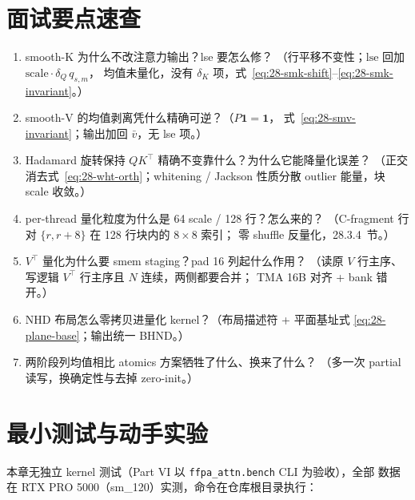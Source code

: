 \section{面试要点速查}

\begin{enumerate}[itemsep=1pt,topsep=2pt]
  \item smooth-K 为什么不改注意力输出？lse 要怎么修？
        （行平移不变性；$\mathrm{lse}$ 回加 $\mathrm{scale}\cdot\delta_Q\,q_{s,m}$，
        均值未量化，没有 $\delta_K$ 项，式~\ref{eq:28-smk-shift}--\ref{eq:28-smk-invariant}。）
  \item smooth-V 的均值剥离凭什么精确可逆？（$P\mathbf{1}=\mathbf{1}$，
        式~\ref{eq:28-smv-invariant}；输出加回 $\bar v$，无 lse 项。）
  \item Hadamard 旋转保持 $QK^{\top}$ 精确不变靠什么？为什么它能降量化误差？
        （正交消去式~\ref{eq:28-wht-orth}；whitening / Jackson 性质分散 outlier
        能量，块 scale 收敛。）
  \item per-thread 量化粒度为什么是 64 scale / 128 行？怎么来的？
        （C-fragment 行对 $\{r,r+8\}$ 在 128 行块内的 $8\times8$ 索引；
        零 shuffle 反量化，28.3.4~节。）
  \item $V^{\top}$ 量化为什么要 smem staging？pad 16 列起什么作用？
        （读原 $V$ 行主序、写逻辑 $V^{\top}$ 行主序且 $N$ 连续，两侧都要合并；
        TMA 16B 对齐 + bank 错开。）
  \item NHD 布局怎么零拷贝进量化 kernel？（布局描述符 + 平面基址式
        \ref{eq:28-plane-base}；输出统一 BHND。）
  \item 两阶段列均值相比 atomics 方案牺牲了什么、换来了什么？
        （多一次 partial 读写，换确定性与去掉 zero-init。）
\end{enumerate}

\section{最小测试与动手实验}

本章无独立 kernel 测试（Part VI 以 \texttt{ffpa\_attn.bench} CLI 为验收），全部
数据在 RTX PRO 5000（sm\_120）实测，命令在仓库根目录执行：

